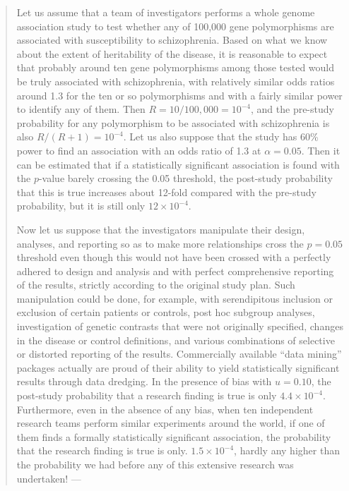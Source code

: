 \documentclass[
]{book}
\begin{document}
\begin{quote}
Let us assume that a team of investigators performs a whole genome association study to test whether any of 100,000 gene polymorphisms are associated with susceptibility to schizophrenia. Based on what we know about the extent of heritability of the disease, it is reasonable to expect that probably around ten gene polymorphisms among those tested would be truly associated with schizophrenia, with relatively similar odds ratios around 1.3 for the ten or so polymorphisms and with a fairly similar power to identify any of them. Then \(R = 10/100,000 = 10^{−4}\), and the pre-study probability for any polymorphism to be associated with schizophrenia is also \(R/(R + 1) = 10^{−4}\). Let us also suppose that the study has 60\% power to find an association with an odds ratio of 1.3 at \(\alpha = 0.05\). Then it can be estimated that if a statistically significant association is found with the \(p\)-value barely crossing the 0.05 threshold, the post-study probability that this is true increases about 12-fold compared with the pre-study probability, but it is still only \(12 × 10^{−4}\).

Now let us suppose that the investigators manipulate their design, analyses, and reporting so as to make more relationships cross the \(p = 0.05\) threshold even though this would not have been crossed with a perfectly adhered to design and analysis and with perfect comprehensive reporting of the results, strictly according to the original study plan. Such manipulation could be done, for example, with serendipitous inclusion or exclusion of certain patients or controls, post hoc subgroup analyses, investigation of genetic contrasts that were not originally specified, changes in the disease or control definitions, and various combinations of selective or distorted reporting of the results. Commercially available ``data mining'' packages actually are proud of their ability to yield statistically significant results through data dredging. In the presence of bias with \(u = 0.10\), the post-study probability that a research finding is true is only \(4.4 × 10^{−4}\). Furthermore, even in the absence of any bias, when ten independent research teams perform similar experiments around the world, if one of them finds a formally statistically significant association, the probability that the research finding is true is only. \(1.5 × 10^{-4}\), hardly any higher than the probability we had before any of this extensive research was undertaken! --- \citep{ioannidis2005most}
\end{quote}
\end{document}
